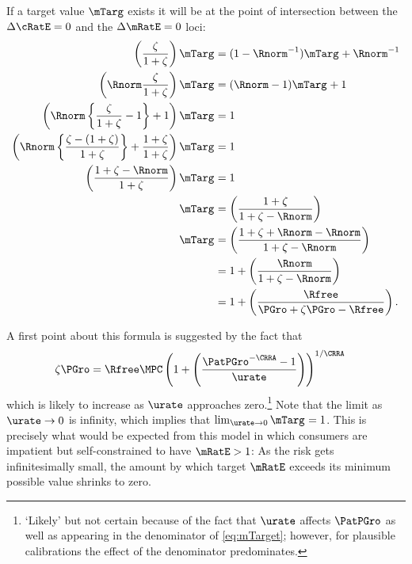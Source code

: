 \documentclass{handout}
\begin{document}
If a target value $\mTarg$ exists it will be at the point of intersection between the $\dcEqZero$ and the $\dmEqZero$ loci:
\begin{equation}\begin{gathered}\begin{aligned}
  \left(\frac{\zeta}{1+\zeta}\right)\mTarg^{\null} & =  (1-\Rnorm^{-1})\mTarg^{\null}+\Rnorm^{-1}
\\  \left(\Rnorm\frac{\zeta}{1+\zeta}\right)\mTarg^{\null} & =  (\Rnorm-1)\mTarg^{\null}+1
\\  \left(\Rnorm\left\{\frac{\zeta}{1+\zeta}-1\right\}+1\right)\mTarg^{\null} & =  1
\\  \left(\Rnorm\left\{\frac{\zeta-(1+\zeta)}{1+\zeta}\right\}+\frac{1+\zeta}{1+\zeta}\right)\mTarg^{\null} & =  1
\\  \left(\frac{1+\zeta-\Rnorm}{1+\zeta}\right)\mTarg^{\null} & =  1
\\  \mTarg^{\null} & =  \left(\frac{1+\zeta}{1+\zeta-\Rnorm}\right)
\\  \mTarg^{\null} & =  \left(\frac{1+\zeta+\Rnorm-\Rnorm}{1+\zeta-\Rnorm}\right)
\\ & =  1 + \left(\frac{\Rnorm}{1+\zeta-\Rnorm}\right)
\\ & =  1 + \left(\frac{\Rfree}{\PGro+\zeta\PGro-\Rfree}\right)  \label{eq:mTarget}
.
\end{aligned}\end{gathered}\end{equation}

A first point about this formula is suggested by the fact that
\begin{equation}\begin{gathered}\begin{aligned}
  \zeta\PGro & =  \Rfree \MPCU \left(1+\left(\frac{\PatPGro^{-\CRRA} - 1}{\urate}\right)\right)^{1/\CRRA}
\end{aligned}\end{gathered}\end{equation}
which is likely to increase as $\urate$ approaches zero.\footnote{`Likely' but not certain because of the fact that $\urate$ affects $\PatPGro$ as well as
  appearing in the denominator of \eqref{eq:mTarget}; however, for
  plausible calibrations the effect of the denominator predominates.}
Note that the limit as $\urate \rightarrow 0$ is infinity, which
implies that $\lim_{\urate \rightarrow
  0} \mTarg^{\null} = 1$.  This is precisely what would be expected from
this model in which consumers are impatient but self-constrained to
have $\mRatE > 1$:  As the risk gets infinitesimally small, the
amount by which target $\mRatE$ exceeds its minimum possible value shrinks to
zero.
\end{document}
